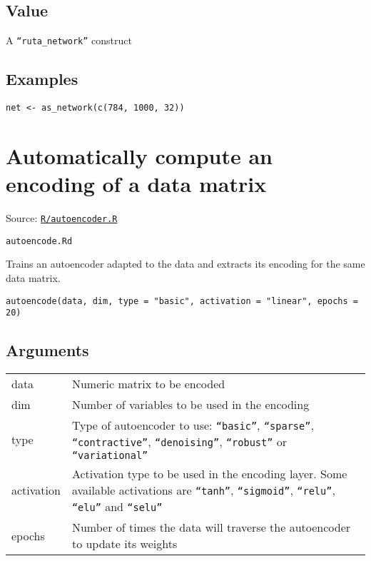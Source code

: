 \hypertarget{value}{\subsection{\texorpdfstring{\protect\hyperlink{value}{}Value}{Value}}\label{value}}

A \texttt{``ruta\_network''} construct

\hypertarget{examples}{\subsection{\texorpdfstring{\protect\hyperlink{examples}{}Examples}{Examples}}\label{examples}}

\begin{verbatim}
net <- as_network(c(784, 1000, 32))
\end{verbatim}

\section{Automatically compute an encoding of a data
matrix}\label{automatically-compute-an-encoding-of-a-data-matrix}

Source:
\href{https://github.com/fdavidcl/ruta/blob/master/R/autoencoder.R}{\texttt{R/autoencoder.R}}

\texttt{autoencode.Rd}

Trains an autoencoder adapted to the data and extracts its encoding for
the same data matrix.

\begin{verbatim}
autoencode(data, dim, type = "basic", activation = "linear", epochs = 20)
\end{verbatim}

\hypertarget{arguments}{\subsection{\texorpdfstring{\protect\hyperlink{arguments}{}Arguments}{Arguments}}\label{arguments}}

\begin{longtable}[c]{@{}>{\small}p{3cm}>{\raggedright}p{12.5cm}@{}}
\toprule
data & Numeric matrix to be encoded\tabularnewline
dim & Number of variables to be used in the encoding\tabularnewline
type & Type of autoencoder to use: \texttt{``basic''}, \texttt{``sparse''},
\texttt{``contractive''}, \texttt{``denoising''}, \texttt{``robust''} or
\texttt{``variational''}\tabularnewline
activation & Activation type to be used in the encoding layer. Some
available activations are \texttt{``tanh''}, \texttt{``sigmoid''},
\texttt{``relu''}, \texttt{``elu''} and \texttt{``selu''}\tabularnewline
epochs & Number of times the data will traverse the autoencoder to
update its weights\tabularnewline
\bottomrule
\end{longtable}

